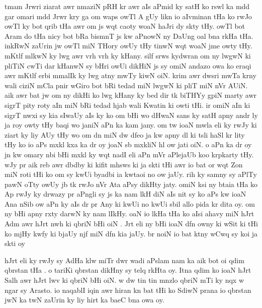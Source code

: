 \documentclass[a4paper]{article}
\begin{document}
tmam Jrwri ziarat awr nmaziN pRH kr awr aIs aPmid ky satH ko rswl ka mdd gar omari mdd Jrwr kry ga om waps owTl A gUy likn io aIvminan tHa ko rwJo owTl ky bot qrib tHa awr om js wqt caoty woaN haJri dy skty tHy.
owTl bot Aram do tHa nicy bot bRa bismnT js kw aPnowN ny DaUng oal bna rkHa tHa.
inkRwN zaUrin jw owTl miN THory owUy tHy tinwN wqt woaN jme owty tHy.
mKtlf mlkwN ky lwg awr vrh vrh ky kHany.
silf srws kydwran om ny lwgwN ki pliTiN cwTi dar kHanwN sy bHri owUi dikHiN js sy omiN andazo owa ko eraqi awr mKtlf erbi mmalIk ky lwg atny mwTy kiwN oiN.
krim awr dwsri mwTa krny wali ciziN mCla pnir wGiro bot bRi tedad miN lwgwN ki pliT miN nVr AUiN.
aik awr bat jw om ny dikHi ko lwg kHany ky bed dir tk biTHYy gpiN marty awr sigrT pity roty aIn miN bRi tedad  hjab wali Kwatin ki owti tHi.
ir omiN aIn ki sigrT nwxi sy kia sIwaUy aIs ky ko om bHi wo dHwaN sans ky satH apny andr  ly ja roy owty tHy baqi wo janiN aPn ka kam jany.
om tw ioaN mwla eli ky rwJy ki ziart ky liy AUy tHy wo om dn miN dw dfeo ja kw apny dl ki tsli haSl kr lity tHy ko io aPs mxkl kxa ka dr oy joaN sb mxkliN hl ow jati oiN.
o aPn ka dr oy jn kw omary nbi bHi mxkl ky wqt nadI eli aPn mVr aPlejaUb koo krpkarty tHy.
wJy pr aik  reb awr dbdby ki kifit mhsws ki ja skti tHi awr io bat or wqt Zon miN roti tHi ko om sy kwUi byadbi ia kwtaoi no ow jaUy.
rih ky samny sy aPlTy pawN oTty owUy jb tk rwJo nVr Ata aPsy dikHty jaty.
omiN ksi ny btaia tHa ko Ap rwJy ky drwazy pr aPngli sy js ka nam lkH diN aIs nit sy ko aPs kw ioaN Ana nSib ow  aPn ky aIs dr pr Any ki kwUi no kwUi  sbil allo pida kr dita oy.
om ny bHi apny rxty darwN ky nam lIkHy.
oaN io lkHa tHa ko aIsi ahavy miN hJrt Adm awr hJrt nwh ki qbriN bHi oiN .
Jrt eli ny bHi ioaN dfn owny ki wSit ki tHi ko mjHy kwfy ki bjaUy njf miN dfn kia jaUy.
br noiN io bat ktny wCwq sy koi ja skti oy

hJrt eli ky rwJy sy AdHa klw miTr dwr wadi aPslam nam ka aik bot oi qdim qbrstan tHa .
o tariKi qbrstan dikHny sy telq rkHta oy.
Itna qdim ko ioaN hJrt Salh awr hJrt lwv ki qbriN bHi oiN.
w dw tin tin mnzlo qbriN mTi ky nqx w ngar sy Arasto.
io naqablI iqin awr hiran kn bat tHi ko SdiwN prana io qbrstan jwN ka twN zaUrin ky liy hirt ka baeC bna owa oy.
\end{document}

